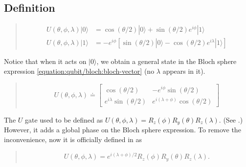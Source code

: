 \documentclass[letterpaper,10pt,english]{jupyterBook}
\begin{document}
\subsection{Definition}
\label{\detokenize{q1gates/u:definition}}
\sphinxAtStartPar
{}
\begin{quote}
\begin{align}
U(\theta,\phi,\lambda) |0\rangle &= \cos(\theta/2) |0\rangle + \sin(\theta/2) e^{i \phi} |1\rangle \\
U(\theta,\phi,\lambda) |1\rangle &= - e^{i \phi} \left[\sin(\theta/2) |0\rangle  - \cos(\theta/2) e^{i \lambda}|1\rangle\right]
\end{align}
\end{quote}

\sphinxAtStartPar
Notice that when it acts on \(|0\rangle\), we obtain a general state in the Bloch sphere expression  \eqref{equation:qubit/bloch:bloch-vector}  (no \(\lambda\) appears in it).

\sphinxAtStartPar
{}
\begin{quote}
\begin{equation*}
\begin{split}
U(\theta,\phi,\lambda) \doteq \begin{bmatrix} \cos(\theta/2) & - e^{i \phi} \sin(\theta/2) \\ e^{i \lambda} \sin(\theta/2) & e^{i (\lambda+\phi)} \cos(\theta/2)\end{bmatrix}
\end{split}
\end{equation*}\end{quote}

\sphinxAtStartPar
{}

\sphinxAtStartPar
The \(U\) gate used to be defined as \(U(\theta,\phi,\lambda)=R_z(\phi) R_y(\theta) R_z(\lambda)\). (See .)  However, it adds a global phase on the Bloch sphere expression. To remove the inconvenience, now it is officially defined in  as
\begin{quote}
\begin{equation*}
\begin{split}
U(\theta,\phi,\lambda) = e^{i (\lambda+\phi)/2} R_z(\phi) R_y(\theta) R_z(\lambda) .
\end{split}
\end{equation*}\end{quote}
\end{document}
